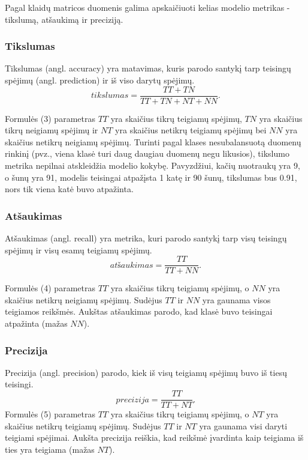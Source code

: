 \documentclass{VUMIFPSbakalaurinis}
\begin{document}
Pagal klaidų matricos duomenis galima apskaičiuoti kelias modelio metrikas - tikslumą, atšaukimą ir preciziją.

\subsubsection{Tikslumas}
Tikslumas (angl. accuracy) yra matavimas, kuris parodo santykį tarp teisingų spėjimų (angl. prediction) ir iš viso darytų spėjimų.
\begin{equation}
\textit{tikslumas} = \frac{TT + TN}{TT + TN + NT + NN}.
\end{equation}

Formulės (3) parametras \(TT\) yra skaičius tikrų teigiamų spėjimų, \(TN\) yra skaičius tikrų neigiamų spėjimų ir \(NT\) yra skaičius netikrų teigiamų spėjimų bei \(NN\) yra skaičius netikrų neigiamų spėjimų.
Turinti pagal klases nesubalansuotą duomenų rinkinį (pvz., viena klasė turi daug daugiau duomenų negu likusios), tikslumo metrika nepilnai atskleidžia modelio kokybę. Pavyzdžiui, kačių nuotraukų yra 9, o šunų yra 91, modelis teisingai atpažįsta 1 katę ir 90 šunų, tikslumas bus 0.91, nors tik viena katė buvo atpažinta. 

\subsubsection{Atšaukimas}
Atšaukimas (angl. recall) yra metrika, kuri parodo santykį tarp visų teisingų spėjimų ir visų esamų teigiamų spėjimų.
\begin{equation}
\textit{atšaukimas} = \frac{TT}{TT + NN}.
\end{equation}

Formulės (4) parametras \(TT\) yra skaičius tikrų teigiamų spėjimų, o \(NN\) yra skaičius netikrų neigiamų spėjimų. Sudėjus \(TT\) ir \(NN\) yra gaunama visos teigiamos reikšmės.
Aukštas atšaukimas parodo, kad klasė buvo teisingai atpažinta (mažas \(NN\)).

\subsubsection{Precizija}
Precizija (angl. precision) parodo, kiek iš visų teigiamų spėjimų buvo iš tiesų teisingi. 
\begin{equation}
\textit{precizija} = \frac{TT}{TT + NT}.
\end{equation}
Formulės (5) parametras \(TT\) yra skaičius tikrų teigiamų spėjimų, o \(NT\) yra skaičius netikrų teigiamų spėjimų. Sudėjus \(TT\) ir \(NT\) yra gaunama visi daryti teigiami spėjimai.
Aukšta precizija reiškia, kad reikšmė įvardinta kaip teigiama iš ties yra teigiama (mažas \(NT\)).
\end{document}
